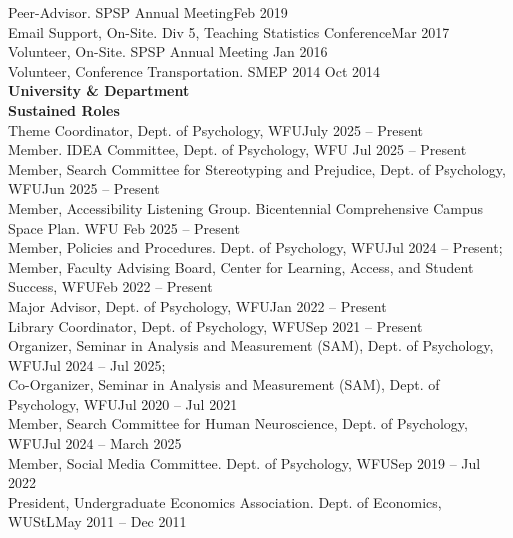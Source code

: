 Peer-Advisor. SPSP Annual Meeting\hfill{Feb 2019}\\
Email Support, On-Site. Div 5, Teaching Statistics Conference\hfill{Mar 2017}\\
Volunteer, On-Site. SPSP Annual Meeting \hfill{Jan 2016}\\
Volunteer, Conference Transportation. SMEP 2014  \hfill{Oct 2014}\medskip\\
{\large \textbf{University \& Department}}\\
\textrm{\textbf{Sustained Roles}}\\
Theme Coordinator, Dept. of Psychology, WFU\hfill {July 2025 – Present}\\
Member. IDEA Committee, Dept. of Psychology, WFU \hfill{Jul 2025 – Present}\\ %
Member, Search Committee for Stereotyping and Prejudice, Dept. of Psychology, WFU\hfill {Jun 2025 – Present}\\
Member, Accessibility Listening Group. \small{Bicentennial Comprehensive Campus Space Plan}. WFU \hfill{Feb 2025 – Present}\\ %
Member, Policies and Procedures. Dept. of Psychology, WFU\hfill{Jul 2024 – Present;}\newline 
{}\\
Member, Faculty Advising Board, Center for Learning, Access, and Student Success, WFU\hfill {Feb 2022 – Present}\\
Major Advisor, Dept. of Psychology, WFU\hfill{Jan 2022 – Present}\\
Library Coordinator, Dept. of Psychology, WFU\hfill {Sep 2021 – Present}\\
Organizer, Seminar in Analysis and Measurement (SAM), Dept. of Psychology, WFU\hfill{Jul 2024 – Jul 2025;}\newline 
{}\\
Co-Organizer, Seminar in Analysis and Measurement (SAM), Dept. of Psychology, WFU\hfill {Jul 2020 – Jul 2021}\\
Member, Search Committee for Human Neuroscience, Dept. of Psychology, WFU\hfill {Jul 2024 – March 2025}\\
Member, Social Media Committee. Dept. of Psychology, WFU\hfill {Sep 2019 – Jul 2022}\\
President, Undergraduate Economics Association. Dept. of Economics, WUStL\hfill{May 2011 – Dec 2011}\\

